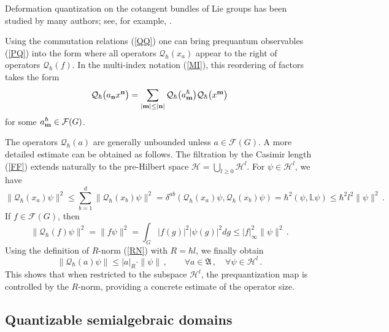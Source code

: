\documentclass[12pt,a4paper]{article}
\numberwithin{equation}{section}
\theoremstyle{theorem}
\theoremstyle{remark}
\newcommand{\hh}{\mathcal{H}}
\newcommand{\fg}{\mathcal{F}(G)}
\newcommand{\fa}{\mathfrak{A}}
\newcommand{\qq}{\mathcal{Q}_{\hbar}}
\begin{document}
Deformation quantization on the cotangent bundles of Lie groups has been studied by many authors; see, for example, \cite{gutt1983explicit, tounsi2003integral, domanski2021deformation}. 

Using the commutation relations (\ref{QQ}) one can bring prequantum observables (\ref{PQ}) into the form where all operators $\qq(x_a)$ appear to the right of operators $\qq(f)$.  In the multi-index notation (\ref{MI}), this reordering of factors takes the form 
\begin{equation}
    \qq\big(a_{\bf n} x^{\bf n}\big)=\sum_{  |{\bf m}|\leq |{\bf n}|   }\qq\big(a^\hbar_{\bf m}\big)\qq\big(x^{\bf m}\big)
\end{equation}
for some $a^\hbar_{\bf m}\in \fg$. 
 
The operators $\qq(a)$ are generally unbounded unless $a\in \fg$. A more detailed estimate can be obtained as follows. The filtration by the Casimir length (\ref{FF}) extends naturally to the pre-Hilbert space $\hh=\bigcup_{l\geq0} \hh^l$. For $\psi\in \mathcal{H}^l$, we have
\begin{equation}\label{qx}
\|\qq(x_a)\psi\|^2\leq \sum_{b=1}^{d}\|\qq(x_b)\psi\|^2=\delta^{ab}(\qq(x_a)\psi,\qq(x_b)\psi)=
\hbar^2(\psi, \mathbb{L}\psi)\leq \hbar^2l^2\|\psi\|^2\,.
\end{equation}
If $f\in \fg$, then 
\begin{equation}
\|\qq(f)\psi\|^2=\|f\psi\|^2=\int_G |f(g)|^2 |\psi(g)|^2dg\leq |f|_\infty ^2\|\psi\|^2\,.
\end{equation}
Using the definition of $R$-norm (\ref{RN}) with $R=\hbar l$, we finally obtain
\begin{equation}\label{QR}
\|\qq(a)\psi \|\leq |a|_{R} \cdot\|\psi\|\,,\qquad \forall a\in \fa\,, \quad \forall \psi\in \hh^l\,.
\end{equation}
This shows that when restricted to the subspace $\hh^l$, the prequantization map is controlled by the $R$-norm, providing a concrete estimate of the operator size.

\subsection{Quantizable semialgebraic domains}
\end{document}

